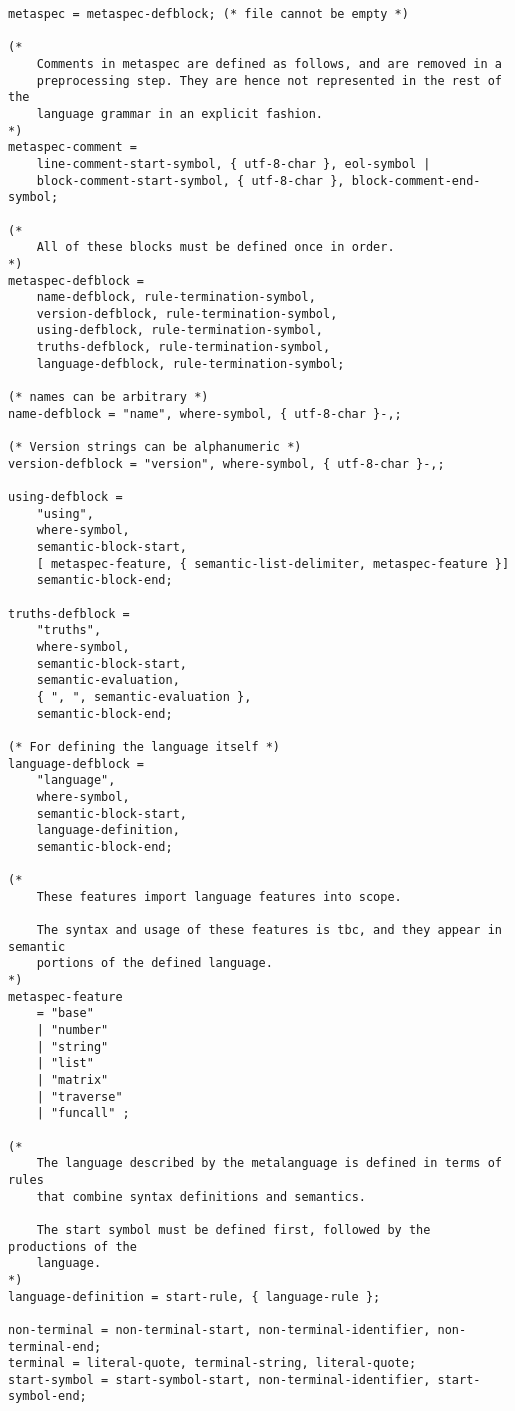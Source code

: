 \begin{verbatim}
metaspec = metaspec-defblock; (* file cannot be empty *)

(* 
    Comments in metaspec are defined as follows, and are removed in a 
    preprocessing step. They are hence not represented in the rest of the 
    language grammar in an explicit fashion. 
*)
metaspec-comment =
    line-comment-start-symbol, { utf-8-char }, eol-symbol |
    block-comment-start-symbol, { utf-8-char }, block-comment-end-symbol;

(* 
    All of these blocks must be defined once in order.
*)
metaspec-defblock = 
    name-defblock, rule-termination-symbol, 
    version-defblock, rule-termination-symbol, 
    using-defblock, rule-termination-symbol, 
    truths-defblock, rule-termination-symbol, 
    language-defblock, rule-termination-symbol;

(* names can be arbitrary *)
name-defblock = "name", where-symbol, { utf-8-char }-,;

(* Version strings can be alphanumeric *)
version-defblock = "version", where-symbol, { utf-8-char }-,;

using-defblock =
    "using",
    where-symbol,
    semantic-block-start,
    [ metaspec-feature, { semantic-list-delimiter, metaspec-feature }]
    semantic-block-end;

truths-defblock =
    "truths",
    where-symbol, 
    semantic-block-start,
    semantic-evaluation,
    { ", ", semantic-evaluation },
    semantic-block-end;

(* For defining the language itself *)
language-defblock =
    "language",
    where-symbol,
    semantic-block-start,
    language-definition,
    semantic-block-end;

(* 
    These features import language features into scope.

    The syntax and usage of these features is tbc, and they appear in semantic
    portions of the defined language.
*)
metaspec-feature
    = "base"
    | "number"
    | "string"
    | "list"
    | "matrix"
    | "traverse"
    | "funcall" ;

(*
    The language described by the metalanguage is defined in terms of rules 
    that combine syntax definitions and semantics.

    The start symbol must be defined first, followed by the productions of the
    language.
*)
language-definition = start-rule, { language-rule };

non-terminal = non-terminal-start, non-terminal-identifier, non-terminal-end;
terminal = literal-quote, terminal-string, literal-quote;
start-symbol = start-symbol-start, non-terminal-identifier, start-symbol-end;


\end{verbatim}
